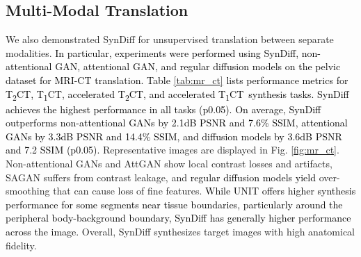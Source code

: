 \documentclass[journal,twoside,web]{ieeecolor}
\newcommand{\TtwoCT}{T\textsubscript{2}CT}
\newcommand{\ToneCT}{T\textsubscript{1}CT}
\renewcommand{\arraystretch}{1.4}
\newcommand*{\revhl}{\textcolor{black}}
\begin{document}
\begin{table}[t]
\caption{\revhl{Average training times per cross-section (sec), inference times per cross-section (sec) and memory load (gigabytes)}.} \centering
\setlength\tabcolsep{2pt}
\renewcommand{\arraystretch}{1.3}
\captionsetup{justification = justified,singlelinecheck = false}
\label{tab:times}
\end{table}



\subsection{Multi-Modal Translation}
We also demonstrated SynDiff for unsupervised translation between separate modalities. \revhl{In particular, experiments were performed using SynDiff, non-attentional GAN, attentional GAN, and regular diffusion models on the pelvic dataset for MRI-CT translation. Table \ref{tab:mr_ct} lists performance metrics for \TtwoCT, \ToneCT, accelerated \TtwoCT, and accelerated \ToneCT~synthesis tasks. SynDiff achieves the highest performance in all tasks (p0.05). On average, SynDiff outperforms non-attentional GANs by 2.1dB PSNR and 7.6\% SSIM, attentional GANs by 3.3dB PSNR and 14.4\% SSIM, and diffusion models by 3.6dB PSNR and 7.2 SSIM (p0.05).} Representative images are displayed in Fig. \ref{fig:mr_ct}. Non-attentional GANs and AttGAN show local contrast losses and artifacts, SAGAN suffers from contrast leakage, and \revhl{regular diffusion models yield} over-smoothing that can cause loss of fine features. \revhl{While UNIT offers higher synthesis performance for some segments near tissue boundaries, particularly around the peripheral body-background boundary, SynDiff has generally higher performance across the image.} Overall, SynDiff synthesizes target images with high anatomical fidelity. 
\end{document}

